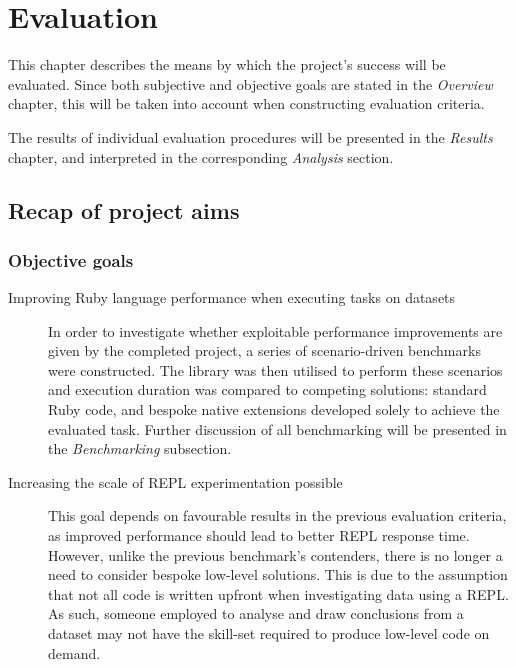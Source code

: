 \chapter{Evaluation}
This chapter describes the means by which the project's success will be evaluated.
Since both subjective and objective goals are stated in the \emph{Overview} chapter, this will be taken into account when constructing evaluation criteria.

The results of individual evaluation procedures will be presented in the \emph{Results} chapter, and interpreted in the corresponding \emph{Analysis} section.

\section{Recap of project aims}
\subsection{Objective goals}
\begin{description}
\item[Improving Ruby language performance when executing tasks on datasets]
In order to investigate whether exploitable performance improvements are given by the completed project, a series of scenario-driven benchmarks were constructed.
The library was then utilised to perform these scenarios and execution duration was compared to competing solutions: standard Ruby code, and bespoke native extensions developed solely to achieve the evaluated task.
Further discussion of all benchmarking will be presented in the \emph{Benchmarking} subsection.
\item[Increasing the scale of \ac{REPL} experimentation possible]
This goal depends on favourable results in the previous evaluation criteria, as improved performance should lead to better \ac{REPL} response time. However, unlike the previous benchmark's contenders, there is no longer a need to consider bespoke low-level solutions. This is due to the assumption that not all code is written upfront when investigating data using a \ac{REPL}. As such, someone employed to analyse and draw conclusions from a dataset may not have the skill-set required to produce low-level code on demand.
\end{description}

